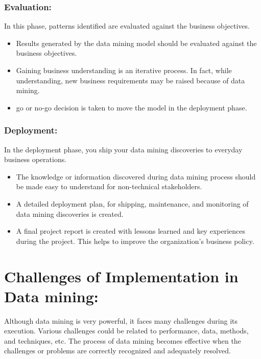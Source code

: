 \documentclass[a4paper,10pt]{article}
\begin{document}
\subsubsection{Evaluation:}
In this phase, patterns identified are evaluated against the business objectives.
\begin{itemize}
	\item Results generated by the data mining model should be evaluated against the business objectives.
	\item Gaining business understanding is an iterative process. In fact, while understanding, new business requirements may be raised because of data mining.
	\item go or no-go decision is taken to move the model in the deployment phase.
\end{itemize}

\subsubsection{Deployment:}
In the deployment phase, you ship your data mining discoveries to everyday business operations.
\begin{itemize}
	\item The knowledge or information discovered during data mining process should be made easy to understand for non-technical stakeholders.
	\item A detailed deployment plan, for shipping, maintenance, and monitoring of data mining discoveries is created.\\
	\item A final project report is created with lessons learned and key experiences during the project. This helps to improve the organization's business policy.
\end{itemize}
\section{Challenges of Implementation in Data mining:}

Although data mining is very powerful, it faces many challenges during its execution. Various challenges could be related to performance, data, methods, and techniques, etc. The process of data mining becomes effective when the challenges or problems are correctly recognized and adequately resolved.
\end{document}
